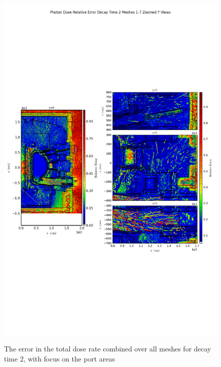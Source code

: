 \documentclass[12pt]{article}
\begin{document}
\begin{figure}[ht!]
\centering
\includegraphics[trim={0cm 9cm 0cm 10cm},clip,scale=0.75]{../plots/final_model/Photon_Dose_Relative_Error_Decay_Time_2_Meshes_1-7_Zoomed_Y_Views.png}
\label{fig:photons_dc2_no4bc_total_error_zoomed}
\caption{The error in the total dose rate combined over all meshes for decay time 2, with focus on the port areas}
\end{figure}
\clearpage
\end{document}
